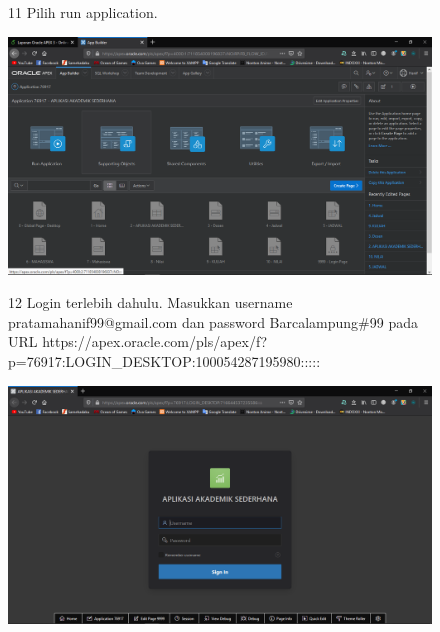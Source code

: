 \begin{enumerate}
\begin{figure}[!htbp]
\item[11] Pilih run application.
\begin{center}
    \includegraphics[scale=0.3]{figures/Screenshot(61).png}
    \end{center}
    \end{figure}
    
\begin{figure}[!htbp]
\item[12] Login terlebih dahulu. Masukkan username pratamahanif99@gmail.com dan password Barcalampung\#99 pada URL https://apex.oracle.com/pls/apex/f?p=76917:LOGIN\_DESKTOP:100054287195980:::::
\begin{center}
    \includegraphics[scale=0.3]{figures/Screenshot(62).png}
    \end{center}
    \end{figure}
    

\end{enumerate}
